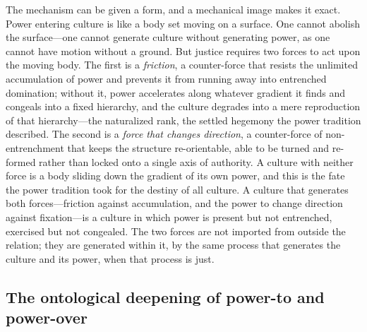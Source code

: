 The mechanism can be given a form, and a mechanical image makes it exact. Power entering culture is like a body set moving on a surface. One cannot abolish the surface---one cannot generate culture without generating power, as one cannot have motion without a ground. But justice requires two forces to act upon the moving body. The first is a \emph{friction}, a counter-force that resists the unlimited accumulation of power and prevents it from running away into entrenched domination; without it, power accelerates along whatever gradient it finds and congeals into a fixed hierarchy, and the culture degrades into a mere reproduction of that hierarchy---the naturalized rank, the settled hegemony the power tradition described. The second is a \emph{force that changes direction}, a counter-force of non-entrenchment that keeps the structure re-orientable, able to be turned and re-formed rather than locked onto a single axis of authority. A culture with neither force is a body sliding down the gradient of its own power, and this is the fate the power tradition took for the destiny of all culture. A culture that generates both forces---friction against accumulation, and the power to change direction against fixation---is a culture in which power is present but not entrenched, exercised but not congealed. The two forces are not imported from outside the relation; they are generated within it, by the same process that generates the culture and its power, when that process is just.

\subsection*{The ontological deepening of power-to and power-over}

